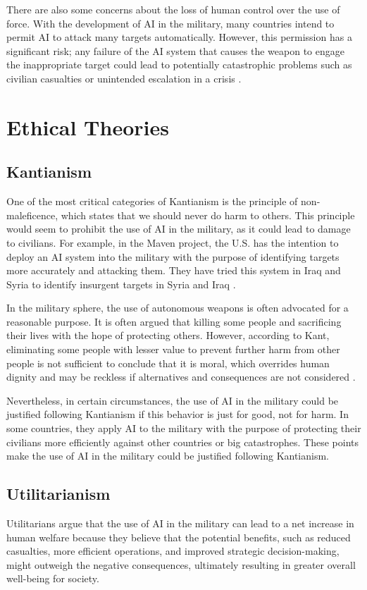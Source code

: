 \documentclass{article}
\begin{document}
There are also some concerns about the loss of human control over the use of force. With the development of AI in the military, many countries intend to permit AI to attack many targets automatically. However, this permission has a significant risk; any failure of the AI system that causes the weapon to engage the inappropriate target could lead to potentially catastrophic problems such as civilian casualties or unintended escalation in a crisis \cite{autoweapon}.

\section{Ethical Theories}
\subsection{Kantianism}
One of the most critical categories of Kantianism is the principle of non-maleficence, which states that we should never do harm to others. This principle would seem to prohibit the use of AI in the military, as it could lead to damage to civilians. For example, in the Maven project, the U.S. has the intention to deploy an AI system into the military with the purpose of identifying targets more accurately and attacking them. They have tried this system in Iraq and Syria to identify insurgent targets in Syria and Iraq \cite{AIinNS}. 

In the military sphere, the use of autonomous weapons is often advocated for a reasonable purpose. It is often argued that killing some people and sacrificing their lives with the hope of protecting others. However, according to Kant, eliminating some people with lesser value to prevent further harm from other people is not sufficient to conclude that it is moral, which overrides human dignity and may be reckless if alternatives and consequences are not considered \cite{KaninAI}.

Nevertheless, in certain circumstances, the use of AI in the military could be justified following Kantianism if this behavior is just for good, not for harm. In some countries, they apply AI to the military with the purpose of protecting their civilians more efficiently against other countries or big catastrophes. These points make the use of AI in the military could be justified following Kantianism.  

\subsection{Utilitarianism}
Utilitarians argue that the use of AI in the military can lead to a net increase in human welfare because they believe that the potential benefits, such as reduced casualties, more efficient operations, and improved strategic decision-making, might outweigh the negative consequences, ultimately resulting in greater overall well-being for society.
\end{document}
